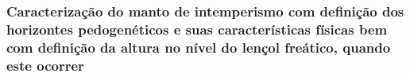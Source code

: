 \subsubsection{Caracterização do manto de intemperismo com definição dos horizontes pedogenéticos e suas características físicas bem com definição da altura no nível do lençol freático, quando este ocorrer}
